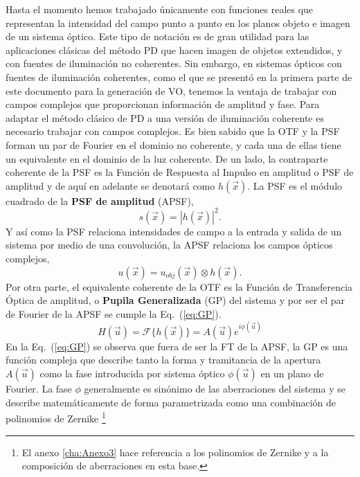 Hasta el momento hemos trabajado únicamente con funciones reales que
representan la intensidad del campo punto a punto en los planos objeto
e imagen de un sistema óptico. Este tipo de notación es de gran utilidad para las
aplicaciones clásicas del método PD que hacen imagen de objetos
extendidos, y con fuentes de iluminación no coherentes. Sin embargo, en
sistemas ópticos con fuentes de iluminación coherentes, como el que se
presentó en la primera parte de este documento 
para la generación de VO, tenemos la ventaja de trabajar con
campos complejos que proporcionan información de amplitud y fase. Para
adaptar el método clásico de PD a una versión de iluminación coherente
es necesario trabajar con campos complejos. Es bien sabido que la OTF
y la PSF forman un par de Fourier en el dominio no coherente, y cada
una de ellas tiene un equivalente en el dominio de la luz
coherente. De un lado, la contraparte coherente de la PSF es la
Función de Respuesta al Impulso en amplitud o PSF de amplitud y de
aquí en adelante se denotará como $h(\vec{x})$. La PSF es el módulo
cuadrado de la \textbf{PSF de amplitud} (\acrshort{APSF}), 
\begin{equation}\label{eq:PSF}
s(\vec{x}) = |h(\vec{x})|^2.
\end{equation}
Y así como la PSF relaciona intensidades de campo a la entrada y salida de
un sistema por medio de una convolución, la APSF relaciona
los campos ópticos complejos,
 \begin{equation}\label{eq:Output_Image_complex}
u(\vec{x}) = u_{obj}(\vec{x}) \otimes h(\vec{x}).
\end{equation}
Por otra parte, el equivalente coherente de la OTF es la Función de
Transferencia Óptica de amplitud, o \textbf{Pupila Generalizada} (\acrshort{GP}) del sistema
y por ser el par de Fourier de la APSF se cumple la Eq.~(\ref{eq:GP}). 
\begin{equation}\label{eq:GP}
 H(\vec{u}) = \mathcal{F} \{h(\vec{x})\} =  A(\vec{u}) e^{i\phi(\vec{u})}
\end{equation}
En la Eq.~(\ref{eq:GP}) se observa que fuera de ser la FT de la APSF, la GP es
una función compleja que describe tanto la forma y
tramitancia de la apertura $A(\vec{u})$ como la fase introducida por sistema
óptico $\phi(\vec{u})$ en un plano de Fourier. La fase $\phi$ generalmente es sinónimo de las
aberraciones del sistema y se describe matemáticamente de forma
parametrizada como una combinación de polinomios de Zernike
\footnote{El anexo \ref{cha:Anexo3} hace referencia a los polinomios
  de Zernike y a la composición de aberraciones en esta base.}

